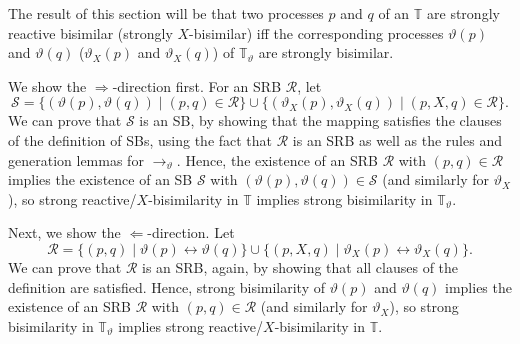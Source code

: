 %
\begin{isabellebody}%
%
%
\isadelimtheory
%
\endisadelimtheory
%
\isatagtheory
%
\endisatagtheory
{\isafoldtheory}%
%
\isadelimtheory
%
\endisadelimtheory
%
\isadelimdocument
%
\endisadelimdocument
%
\isatagdocument
%
\isamarkuptrue%
%
\endisatagdocument
{\isafolddocument}%
%
\isadelimdocument
%
\endisadelimdocument
%
\begin{isamarkuptext}%
\label{sec:reduction_bisimilarity}%
\end{isamarkuptext}\isamarkuptrue%
%
\begin{isamarkuptext}%
The result of this section will be that two processes $p$ and $q$ of an \LTSt{} $\mathbb{T}$ are strongly reactive bisimilar (strongly $X$-bisimilar) iff the corresponding processes $\vartheta(p)$ and $\vartheta(q)$ ($\vartheta_X(p)$ and $\vartheta_X(q)$) of $\mathbb{T}_\vartheta$ are strongly bisimilar. 

We show the $\Longrightarrow$-direction first. For an SRB $\mathcal{R}$, let
$$\mathcal{S} = \{ (\vartheta(p), \vartheta(q)) \mid (p, q) \in \mathcal{R} \} \cup \{ (\vartheta_X(p), \vartheta_X(q)) \mid (p, X, q) \in \mathcal{R} \}.$$
We can prove that $\mathcal{S}$ is an SB, by showing that the mapping satisfies the clauses of the definition of SBs, using the fact that $\mathcal{R}$ is an SRB as well as the rules and generation lemmas for $\rightarrow_\vartheta$. Hence, the existence of an SRB $\mathcal{R}$ with $(p, q) \in \mathcal{R}$ implies the existence of an SB $\mathcal{S}$ with $(\vartheta(p), \vartheta(q)) \in \mathcal{S}$ (and similarly for $\vartheta_X$), so strong reactive/$X$-bisimilarity in $\mathbb{T}$ implies strong bisimilarity in $\mathbb{T}_\vartheta$.

Next, we show the $\Longleftarrow$-direction. Let
$$\mathcal{R} = \{ (p, q) \mid \vartheta(p) \leftrightarrow \vartheta(q) \} \cup \{ (p, X, q) \mid \vartheta_X(p) \leftrightarrow \vartheta_X(q) \}.$$
We can prove that $\mathcal{R}$ is an SRB, again, by showing that all clauses of the definition are satisfied. Hence, strong bisimilarity of $\vartheta(p)$ and $\vartheta(q)$ implies the existence of an SRB $\mathcal{R}$ with $(p, q) \in \mathcal{R}$ (and similarly for $\vartheta_X$), so strong bisimilarity in $\mathbb{T}_\vartheta$ implies strong reactive/$X$-bisimilarity in $\mathbb{T}$.


\end{isamarkuptext}
\end{isabellebody}

